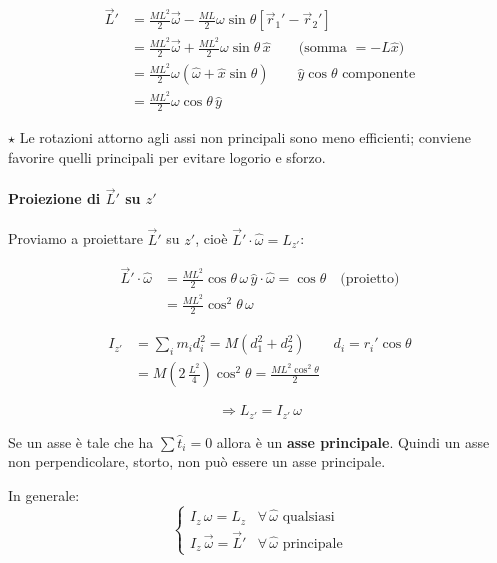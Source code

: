 \begin{align*}
\vec{L}' &= \frac{ML^2}{2}\vec{\omega} - \frac{ML}{2}\omega\sin\theta\left[\vec{r}_1' - \vec{r}_2'\right] \\
&= \frac{ML^2}{2}\vec{\omega} + \frac{ML^2}{2}\omega\sin\theta\,\hat{x} \qquad \text{(somma $= -L\hat{x}$)} \\
&= \frac{ML^2}{2}\omega\left(\hat{\omega} + \hat{x}\sin\theta\right) \qquad \hat{y}\cos\theta \text{ componente} \\
&= \boxed{\frac{ML^2}{2}\omega\cos\theta\,\hat{y}}
\end{align*}

$\star$ Le rotazioni attorno agli assi non principali sono meno efficienti; conviene favorire quelli principali per evitare logorio e sforzo.

\paragraph{Proiezione di $\vec{L}'$ su $z'$}
Proviamo a proiettare $\vec{L}'$ su $z'$, cioè $\vec{L}' \cdot \hat{\omega} = L_{z'}$:

\begin{align*}
\vec{L}' \cdot \hat{\omega} &= \frac{ML^2}{2}\cos\theta\,\omega\,\hat{y}\cdot\hat{\omega} = \cos\theta \quad \text{(proietto)} \\
&= \frac{ML^2}{2}\cos^2\theta\,\omega
\end{align*}

\begin{align*}
I_{z'} &= \sum_i m_i d_i^2 = M(d_1^2 + d_2^2) \qquad d_i = r_i'\cos\theta \\
&= M\left(2\,\frac{L^2}{4}\right)\cos^2\theta = \frac{ML^2\cos^2\theta}{2}
\end{align*}

\begin{equation}
\Rightarrow \boxed{L_{z'} = I_{z'}\,\omega}
\end{equation}

\begin{osservazione}{}
Se un asse è tale che ha $\sum \hat{t}_i = 0$ allora è un \textbf{asse principale}. Quindi un asse non perpendicolare, storto, non può essere un asse principale.

In generale:
\[
\begin{cases}
I_z\,\omega = L_z & \forall\,\hat{\omega} \text{ qualsiasi} \\
I_z\,\vec{\omega} = \vec{L}' & \forall\,\hat{\omega} \text{ principale}
\end{cases}
\]
\end{osservazione}
